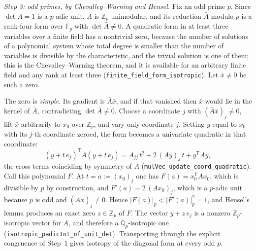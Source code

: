 \emph{Step 3: odd primes, by Chevalley--Warning and Hensel.} Fix an odd
prime $p$. Since $\det A = 1$ is a $p$-adic unit, $A$ is
$\mathbb{Z}_p$-unimodular, and its reduction $\bar A$ modulo $p$ is a
rank-four form over $\mathbb{F}_p$ with $\det\bar A \neq 0$. A quadratic
form in at least three variables over a finite field has a nontrivial
zero, because the number of solutions of a polynomial system whose total
degree is smaller than the number of variables is divisible by the
characteristic, and the trivial solution is one of them; this is the
Chevalley--Warning theorem, and it is available for an arbitrary finite
field and any rank at least three
(\texttt{finite\_field\_form\_isotropic}). Let $\bar x \neq 0$ be such a
zero.

The zero is \emph{simple}. Its gradient is $\bar A\bar x$, and if that
vanished then $\bar x$ would lie in the kernel of $\bar A$, contradicting
$\det \bar A \neq 0$. Choose a coordinate $j$ with
$(\bar A \bar x)_j \neq 0$, lift $\bar x$ arbitrarily to $x_0$ over
$\mathbb{Z}_p$, and vary only coordinate $j$. Setting $y$ equal to $x_0$
with its $j$-th coordinate zeroed, the form becomes a univariate quadratic
in that coordinate:
\begin{equation}
\left(y + t\,e_j\right)^{\mathsf T}\! A \left(y + t\,e_j\right)
= A_{jj}\,t^2 + 2\,(Ay)_j\, t + y^{\mathsf T} A y ,
\label{eq:univariate}
\end{equation}
the cross terms coinciding by symmetry of $A$
(\texttt{mulVec\_update\_coord\_quadratic}). Call this polynomial $F$.
At $t = a := (x_0)_j$ one has $F(a) = x_0^{\mathsf T} A x_0$, which is
divisible by $p$ by construction, and
$F'(a) = 2\,(A x_0)_j$, which is a $p$-adic unit because $p$ is odd and
$(\bar A\bar x)_j \neq 0$. Hence $|F(a)|_p < |F'(a)|_p^2 = 1$, and
Hensel's lemma produces an exact zero $z \in \mathbb{Z}_p$ of $F$. The
vector $y + z\,e_j$ is a nonzero $\mathbb{Z}_p$-isotropic vector for $A$,
and therefore a $\mathbb{Q}_p$-isotropic one
(\texttt{isotropic\_padicInt\_of\_unit\_det}). Transporting through the
explicit congruence of Step~1 gives isotropy of the diagonal form at every
odd $p$.

